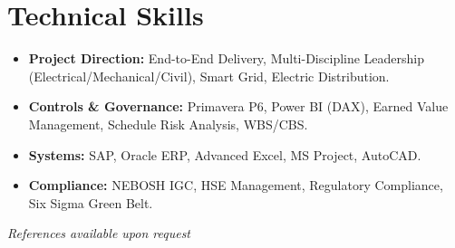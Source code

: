 \documentclass[11pt,a4paper]{article}
\begin{document}
\section{Technical Skills}
\begin{itemize}[label={\color{awesome-blue}\small\textbullet}, leftmargin=*, itemsep=0pt, parsep=0pt]
    \raggedright
    \item \textbf{Project Direction:} End-to-End Delivery, Multi-Discipline Leadership (Electrical/Mechanical/Civil), Smart Grid, Electric Distribution.
    \item \textbf{Controls \& Governance:} Primavera P6, Power BI (DAX), Earned Value Management, Schedule Risk Analysis, WBS/CBS.
    \item \textbf{Systems:} SAP, Oracle ERP, Advanced Excel, MS Project, AutoCAD.
    \item \textbf{Compliance:} NEBOSH IGC, HSE Management, Regulatory Compliance, Six Sigma Green Belt.
\end{itemize}

\vfill
\begin{center}
    \textit{References available upon request}
\end{center}
\end{document}
